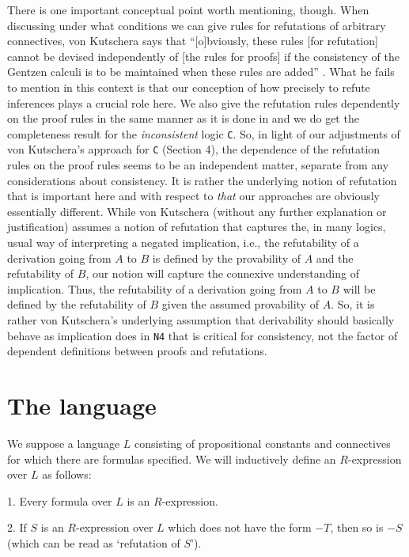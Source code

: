 \documentclass{article}%
\theoremstyle{break}
\begin{document}
There is one important conceptual point worth mentioning, though.
When discussing under what conditions we can give rules for refutations of arbitrary connectives, von Kutschera says that ``[o]bviously, these rules [for refutation] cannot be devised independently of [the rules for proofs] if the consistency of the Gentzen calculi is to be maintained when these rules are added'' \cite[p. 108, (translated by the authors)]{Kutschera1969}.
What he fails to mention in this context is that our conception of how precisely to refute inferences plays a crucial role here.
We also give the refutation rules dependently on the proof rules in the same manner as it is done in \cite{Kutschera1969} and we do get the completeness result for the \emph{inconsistent} logic \texttt{C}.
So, in light of our adjustments of von Kutschera's approach for \texttt{C} (Section 4), the dependence of the refutation rules on the proof rules seems  to be an independent matter, separate from any considerations about consistency.
It is rather the underlying notion of refutation that is important here and with respect to \emph{that} our approaches are obviously essentially different.
While von Kutschera (without any further explanation or justification) assumes a notion of refutation that captures the, in many logics, usual way of interpreting a negated implication, i.e., the refutability of a derivation going from $A$ to $B$ is defined by the provability of $A$ and the refutability of $B$, our notion will capture the connexive understanding of implication.
Thus, the refutability of a derivation going from $A$ to $B$ will be defined by the refutability of $B$ given the assumed provability of $A$.
So, it is rather von Kutschera's underlying assumption that derivability should basically behave as implication does in \texttt{N4} that is critical for consistency, not the factor of dependent definitions between proofs and refutations.







\section{The language}
We suppose a language $L$ consisting of propositional constants and connectives for which there are formulas specified.
We will inductively define an $R$-expression over $L$ as follows:

1. Every formula over $L$ is an $R$-expression.

2. If $S$ is an $R$-expression over $L$ which does not have the form $-T$, then so is $-S$ (which can be read as `refutation of $S$').
\end{document}
